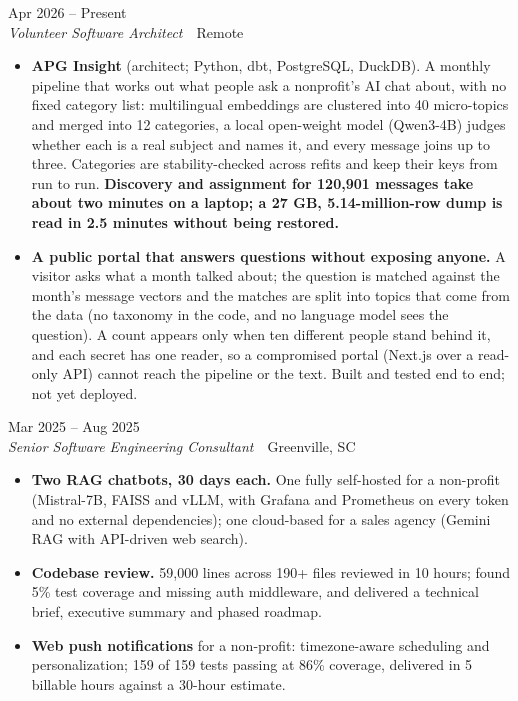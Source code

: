 \documentclass[10pt,letterpaper]{article}
\newcommand{\szmeta}{\fontsize{8pt}{10pt}\selectfont}
\begin{document}
\vspace{3pt}
 \hfill {\color{muted}\szmeta Apr 2026 – Present}\\[1pt]
{\itshape Volunteer Software Architect}{\color{muted}\ \textbullet\ Remote}
\vspace{2pt}
\begin{itemize}
\item \textbf{APG Insight} {\color{muted}(architect; Python, dbt, PostgreSQL, DuckDB)}. A monthly pipeline that works out what people ask a nonprofit's AI chat about, with no fixed category list: multilingual embeddings are clustered into 40 micro-topics and merged into 12 categories, a local open-weight model (Qwen3-4B) judges whether each is a real subject and names it, and every message joins up to three. Categories are stability-checked across refits and keep their keys from run to run. \textbf{Discovery and assignment for 120,901 messages take about two minutes on a laptop; a 27 GB, 5.14-million-row dump is read in 2.5 minutes without being restored.}
\item \textbf{A public portal that answers questions without exposing anyone.} A visitor asks what a month talked about; the question is matched against the month's message vectors and the matches are split into topics that come from the data (no taxonomy in the code, and no language model sees the question). A count appears only when ten different people stand behind it, and each secret has one reader, so a compromised portal (Next.js over a read-only API) cannot reach the pipeline or the text. Built and tested end to end; not yet deployed.
\end{itemize}
\vspace{3pt}
 \hfill {\color{muted}\szmeta Mar 2025 – Aug 2025}\\[1pt]
{\itshape Senior Software Engineering Consultant}{\color{muted}\ \textbullet\ Greenville, SC}
\vspace{2pt}
\begin{itemize}
\item \textbf{Two RAG chatbots, 30 days each.} One fully self-hosted for a non-profit (Mistral-7B, FAISS and vLLM, with Grafana and Prometheus on every token and no external dependencies); one cloud-based for a sales agency (Gemini RAG with API-driven web search).
\item \textbf{Codebase review.} 59,000 lines across 190+ files reviewed in 10 hours; found 5\% test coverage and missing auth middleware, and delivered a technical brief, executive summary and phased roadmap.
\item \textbf{Web push notifications} for a non-profit: timezone-aware scheduling and personalization; 159 of 159 tests passing at 86\% coverage, delivered in 5 billable hours against a 30-hour estimate.
\end{itemize}
\end{document}
